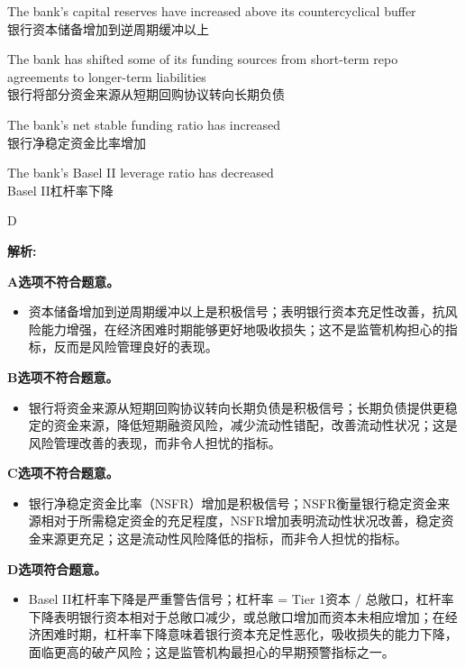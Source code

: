 \documentclass{article}
\newenvironment{explanation}
{\textbf{解析:}\par}
{\par}
\begin{document}
\begin{choices}
    \item The bank's capital reserves have increased above its countercyclical buffer\\
    银行资本储备增加到逆周期缓冲以上
    \item The bank has shifted some of its funding sources from short-term repo agreements to longer-term liabilities\\
    银行将部分资金来源从短期回购协议转向长期负债
    \item The bank's net stable funding ratio has increased\\
    银行净稳定资金比率增加
    \item The bank's Basel II leverage ratio has decreased\\
    Basel II杠杆率下降
\end{choices}

\begin{correctanswer}
    D
\end{correctanswer}

\begin{explanation}
    \textbf{A选项不符合题意。}
    \begin{itemize}
        \item 资本储备增加到逆周期缓冲以上是积极信号；表明银行资本充足性改善，抗风险能力增强，在经济困难时期能够更好地吸收损失；这不是监管机构担心的指标，反而是风险管理良好的表现。
    \end{itemize}

    \textbf{B选项不符合题意。}
    \begin{itemize}
        \item 银行将资金来源从短期回购协议转向长期负债是积极信号；长期负债提供更稳定的资金来源，降低短期融资风险，减少流动性错配，改善流动性状况；这是风险管理改善的表现，而非令人担忧的指标。
    \end{itemize}

    \textbf{C选项不符合题意。}
    \begin{itemize}
        \item 银行净稳定资金比率（NSFR）增加是积极信号；NSFR衡量银行稳定资金来源相对于所需稳定资金的充足程度，NSFR增加表明流动性状况改善，稳定资金来源更充足；这是流动性风险降低的指标，而非令人担忧的指标。
    \end{itemize}

    \textbf{D选项符合题意。}
    \begin{itemize}
        \item Basel II杠杆率下降是严重警告信号；杠杆率 = Tier 1资本 / 总敞口，杠杆率下降表明银行资本相对于总敞口减少，或总敞口增加而资本未相应增加；在经济困难时期，杠杆率下降意味着银行资本充足性恶化，吸收损失的能力下降，面临更高的破产风险；这是监管机构最担心的早期预警指标之一。
    \end{itemize}
\end{explanation}
\end{document}
